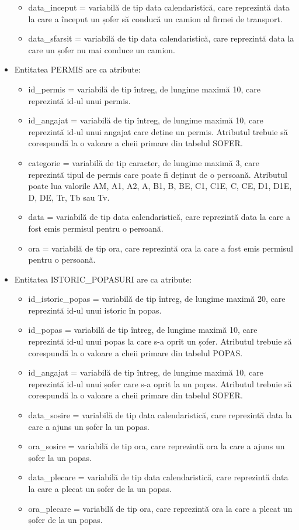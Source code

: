 \documentclass[12pt, a4paper]{article}
\begin{document}
\begin{itemize}
\begin{itemize}
            \item data\_inceput = variabilă de tip data calendaristică, care reprezintă data la care a început un șofer să conducă un camion al firmei de transport.
            \item data\_sfarsit = variabilă de tip data calendaristică, care reprezintă data la care un șofer nu mai conduce un camion.
        \end{itemize}
    \item Entitatea PERMIS are ca atribute:
        \begin{itemize}
            \item id\_permis = variabilă de tip întreg, de lungime maximă 10, care reprezintă id-ul unui permis.
            \item id\_angajat = variabilă de tip întreg, de lungime maximă 10, care reprezintă id-ul unui angajat care deține un permis. Atributul trebuie să corespundă la o valoare a cheii primare din tabelul SOFER.
            \item categorie = variabilă de tip caracter, de lungime maximă 3, care reprezintă tipul de permis care poate fi deținut de o persoană. Atributul poate lua valorile AM, A1, A2, A, B1, B, BE, C1, C1E, C, CE, D1, D1E, D, DE, Tr, Tb sau Tv.
            \item data = variabilă de tip data calendaristică, care reprezintă data la care a fost emis permisul pentru o persoană.
            \item ora = variabilă de tip ora, care reprezintă ora la care a fost emis permisul pentru o persoană.
        \end{itemize}
    \item Entitatea ISTORIC\_POPASURI are ca atribute:
        \begin{itemize}
            \item id\_istoric\_popas = variabilă de tip întreg, de lungime maximă 20, care reprezintă id-ul unui istoric în popas.
            \item id\_popas = variabilă de tip întreg, de lungime maximă 10, care reprezintă id-ul unui popas la care s-a oprit un șofer. Atributul trebuie să corespundă la o valoare a cheii primare din tabelul POPAS.
            \item id\_angajat = variabilă de tip întreg, de lungime maximă 10, care reprezintă id-ul unui șofer care s-a oprit la un popas. Atributul trebuie să corespundă la o valoare a cheii primare din tabelul SOFER.
            \item data\_sosire = variabilă de tip data calendaristică, care reprezintă data la care a ajuns un șofer la un popas.
            \item ora\_sosire = variabilă de tip ora, care reprezintă ora la care a ajuns un șofer la un popas.
            \item data\_plecare = variabilă de tip data calendaristică, care reprezintă data la care a plecat un șofer de la un popas.
            \item ora\_plecare = variabilă de tip ora, care reprezintă ora la care a plecat un șofer de la un popas.
        \end{itemize}
\end{itemize}
\end{document}
